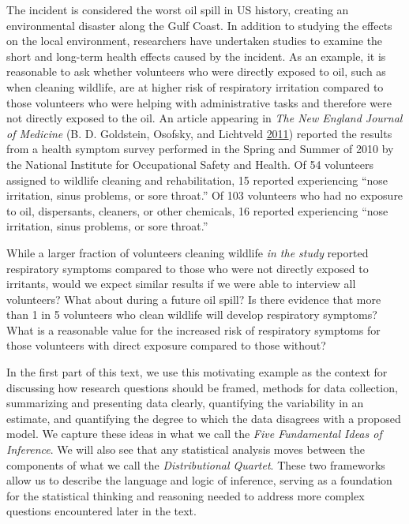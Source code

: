 \documentclass[]{book}
\theoremstyle{plain}
\theoremstyle{mydefn}
\theoremstyle{myexmpl}
\theoremstyle{remark}
\begin{document}
The incident is considered the worst oil spill in US history, creating
an environmental disaster along the Gulf Coast. In addition to studying
the effects on the local environment, researchers have undertaken
studies to examine the short and long-term health effects caused by the
incident. As an example, it is reasonable to ask whether volunteers who
were directly exposed to oil, such as when cleaning wildlife, are at
higher risk of respiratory irritation compared to those volunteers who
were helping with administrative tasks and therefore were not directly
exposed to the oil. An article appearing in \emph{The New England
Journal of Medicine} (B. D. Goldstein, Osofsky, and Lichtveld
\protect\hyperlink{ref-Goldstein2011}{2011}) reported the results from a
health symptom survey performed in the Spring and Summer of 2010 by the
National Institute for Occupational Safety and Health. Of 54 volunteers
assigned to wildlife cleaning and rehabilitation, 15 reported
experiencing ``nose irritation, sinus problems, or sore throat.'' Of 103
volunteers who had no exposure to oil, dispersants, cleaners, or other
chemicals, 16 reported experiencing ``nose irritation, sinus problems,
or sore throat.''

While a larger fraction of volunteers cleaning wildlife \emph{in the
study} reported respiratory symptoms compared to those who were not
directly exposed to irritants, would we expect similar results if we
were able to interview all volunteers? What about during a future oil
spill? Is there evidence that more than 1 in 5 volunteers who clean
wildlife will develop respiratory symptoms? What is a reasonable value
for the increased risk of respiratory symptoms for those volunteers with
direct exposure compared to those without?

In the first part of this text, we use this motivating example as the
context for discussing how research questions should be framed, methods
for data collection, summarizing and presenting data clearly,
quantifying the variability in an estimate, and quantifying the degree
to which the data disagrees with a proposed model. We capture these
ideas in what we call the \emph{Five Fundamental Ideas of Inference}. We
will also see that any statistical analysis moves between the components
of what we call the \emph{Distributional Quartet}. These two frameworks
allow us to describe the language and logic of inference, serving as a
foundation for the statistical thinking and reasoning needed to address
more complex questions encountered later in the text.
\end{document}
